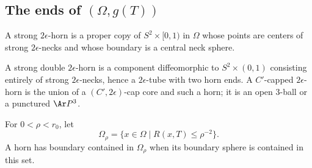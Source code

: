 \subsection{The ends of $(\Omega,g(T))$}
\begin{definition}
\label{def:strong-epsilon-horn}
A strong $2\epsilon$-horn is a proper copy of $S^2\times[0,1)$ in $\Omega$
whose points are centers of strong $2\epsilon$-necks and whose boundary is a
central neck sphere.
\end{definition}
\begin{definition}
\label{def:strong-double-and-capped-horn}
A strong double $2\epsilon$-horn is a component diffeomorphic to
$S^2\times(0,1)$ consisting entirely of strong $2\epsilon$-necks, hence a
$2\epsilon$-tube with two horn ends. A $C'$-capped $2\epsilon$-horn is the
union of a $(C',2\epsilon)$-cap core and such a horn; it is an open
$3$-ball or a punctured $\Ar P^3$.
\end{definition}
\begin{definition}
\label{def:omega-rho}
For $0<\rho<r_0$, let
$$\Omega_\rho=\{x\in\Omega\mid R(x,T)\le\rho^{-2}\}.$$
A horn has boundary contained in $\Omega_\rho$ when its boundary sphere is
contained in this set.
\end{definition}

